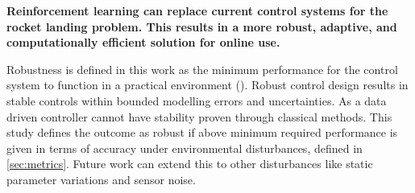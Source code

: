 \begin{center}
    \textbf{Reinforcement learning can replace current control systems for the rocket landing problem. This results in a more robust, adaptive, and computationally efficient solution for online use.}
\end{center}

Robustness is defined in this work as the minimum performance for the control system to function in a practical environment (\cite{ZHANG201041}). Robust control design results in stable controls within bounded modelling errors and uncertainties. As a data driven controller cannot have stability proven through classical methods. This study defines the outcome as robust if above minimum required performance is given in terms of accuracy under environmental disturbances, defined in \autoref{sec:metrics}. Future work can extend this to other disturbances like static parameter variations and sensor noise.